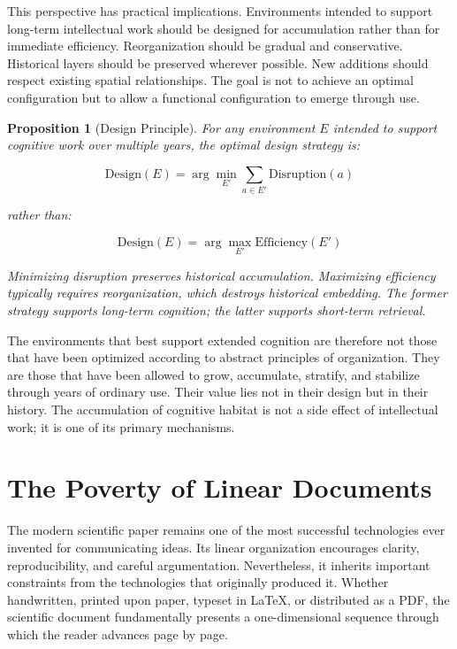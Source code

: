 \documentclass[12pt,oneside]{article}
\newtheorem{proposition}[definition]{Proposition}
\theoremstyle{remark}
\begin{document}
This perspective has practical implications. Environments intended to support long-term intellectual work should be designed for accumulation rather than for immediate efficiency. Reorganization should be gradual and conservative. Historical layers should be preserved wherever possible. New additions should respect existing spatial relationships. The goal is not to achieve an optimal configuration but to allow a functional configuration to emerge through use.

\begin{proposition}[Design Principle]
For any environment $E$ intended to support cognitive work over multiple years, the optimal design strategy is:

\begin{equation}
\text{Design}(E) = \arg\min_{E'} \sum_{a \in E'} \text{Disruption}(a)
\end{equation}

rather than:

\begin{equation}
\text{Design}(E) = \arg\max_{E'} \text{Efficiency}(E')
\end{equation}

Minimizing disruption preserves historical accumulation. Maximizing efficiency typically requires reorganization, which destroys historical embedding. The former strategy supports long-term cognition; the latter supports short-term retrieval.
\end{proposition}

The environments that best support extended cognition are therefore not those that have been optimized according to abstract principles of organization. They are those that have been allowed to grow, accumulate, stratify, and stabilize through years of ordinary use. Their value lies not in their design but in their history. The accumulation of cognitive habitat is not a side effect of intellectual work; it is one of its primary mechanisms.


\section{The Poverty of Linear Documents}

The modern scientific paper remains one of the most successful technologies ever invented for communicating ideas. Its linear organization encourages clarity, reproducibility, and careful argumentation. Nevertheless, it inherits important constraints from the technologies that originally produced it. Whether handwritten, printed upon paper, typeset in \LaTeX{}, or distributed as a PDF, the scientific document fundamentally presents a one-dimensional sequence through which the reader advances page by page.
\end{document}
